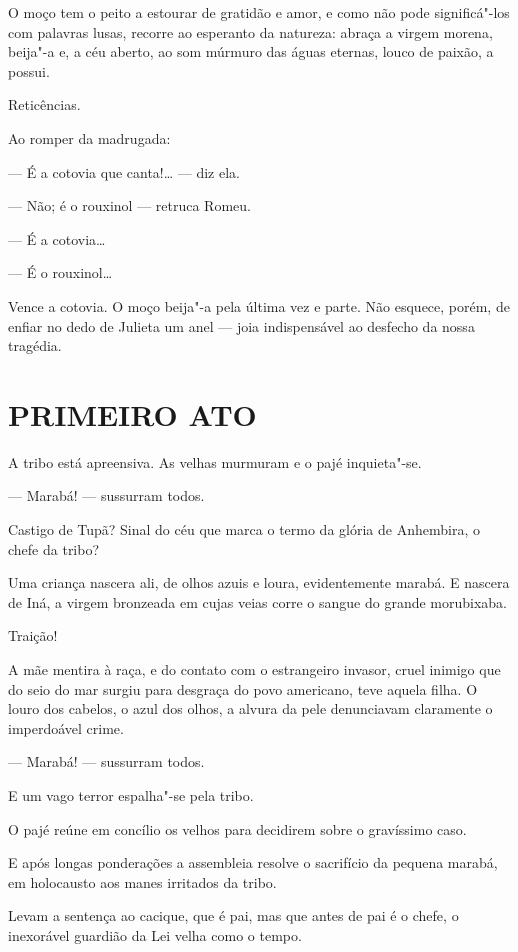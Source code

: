 O moço tem o peito a estourar de gratidão e amor, e como não pode
significá"-los com palavras lusas, recorre ao esperanto da natureza:
abraça a virgem morena, beija"-a e, a céu aberto, ao som múrmuro das
águas eternas, louco de paixão, a possui.

Reticências.

Ao romper da madrugada:

--- É a cotovia que canta!\ldots{} --- diz ela.

--- Não; é o rouxinol --- retruca Romeu.

--- É a cotovia\ldots{}

--- É o rouxinol\ldots{}

Vence a cotovia. O moço beija"-a pela última vez e parte. Não esquece,
porém, de enfiar no dedo de Julieta um anel --- joia indispensável ao
desfecho da nossa tragédia.

\section*{PRIMEIRO ATO}

A tribo está apreensiva. As velhas murmuram e o pajé inquieta"-se.

--- Marabá! --- sussurram todos.

Castigo de Tupã? Sinal do céu que marca o termo da glória de Anhembira,
o chefe da tribo?

Uma criança nascera ali, de olhos azuis e loura, evidentemente marabá. E
nascera de Iná, a virgem bronzeada em cujas veias corre o sangue do
grande morubixaba.

Traição!

A mãe mentira à raça, e do contato com o estrangeiro invasor, cruel
inimigo que do seio do mar surgiu para desgraça do povo americano, teve
aquela filha. O louro dos cabelos, o azul dos olhos, a alvura da pele
denunciavam claramente o imperdoável crime.

--- Marabá! --- sussurram todos.

E um vago terror espalha"-se pela tribo.

O pajé reúne em concílio os velhos para decidirem sobre o gravíssimo
caso.

E após longas ponderações a assembleia resolve o sacrifício da pequena
marabá, em holocausto aos manes irritados da tribo.

Levam a sentença ao cacique, que é pai, mas que antes de pai é o chefe,
o inexorável guardião da Lei velha como o tempo.


